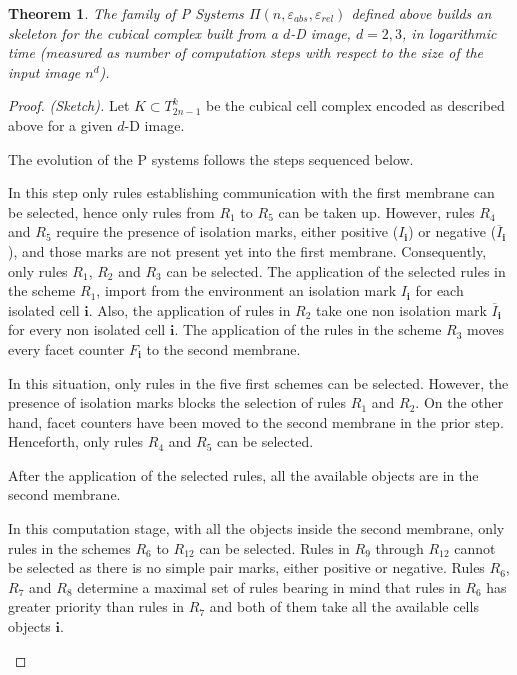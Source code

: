 \documentclass[journal]{IEEEtran}
\newtheorem{theorem}{Theorem}
\begin{document}
\begin{theorem}
The family of P Systems $\Pi(n, \varepsilon_{abs}, \varepsilon_{rel})$ defined above builds an skeleton for the
cubical complex built from a $d$-D image, $d=2,3$, in logarithmic time (measured as number of computation steps 
with respect to the size of the input image $n^d$). 
\end{theorem}
\begin{proof} {\it (Sketch).} Let $K \subset T_{2n-1}^k$ be the cubical cell complex encoded as described above for a given $d$-D image.

The evolution of the P systems follows the steps sequenced below.
\begin{list}{\textbf{Step }}{}
\item In this step only rules establishing communication with the first membrane
can be selected, hence only rules from $R_1$ to $R_5$ can be taken
up. However, rules $R_4$ and $R_5$ require the presence of isolation
marks, either positive ($I_\mathbf{i}$) or negative
($\overline{I}_\mathbf{i}$), and those marks are not present yet
into the first membrane. Consequently, only rules $R_1$, $R_2$ and
$R_3$ can be selected. The application of the selected rules in the
scheme $R_1$, import from the environment an isolation mark
$I_\mathbf{i}$ for each isolated cell $\mathbf{i}$. Also, the
application of rules in $R_2$ take one non isolation mark
$\overline{I}_\mathbf{i}$ for every non isolated cell $\mathbf{i}$.
The application of the rules in the scheme $R_3$ moves every facet
counter $F_\mathbf{i}$ to the second membrane.
\item In this situation, only rules in the five first schemes can be selected.
However, the presence of isolation marks blocks the selection of
rules $R_1$ and $R_2$. On the other hand, facet counters have been
moved to the second membrane in the prior step. Henceforth, only
rules $R_4$ and $R_5$ can be selected.

After the application of the selected rules, all the available objects are in
the second membrane.
\item In this computation stage, with all the objects inside the second
membrane, only rules in the schemes $R_6$ to $R_{12}$ can be selected. Rules in
$R_9$ through $R_{12}$ cannot be selected as there is no simple pair marks,
either positive or negative. Rules $R_6$, $R_7$ and $R_8$ determine a maximal
set of rules bearing in mind that rules in $R_6$ has greater priority than rules
in $R_7$ and both of them take all the available cells objects $\mathbf{i}$.


\end{list}
\end{proof}
\end{document}
